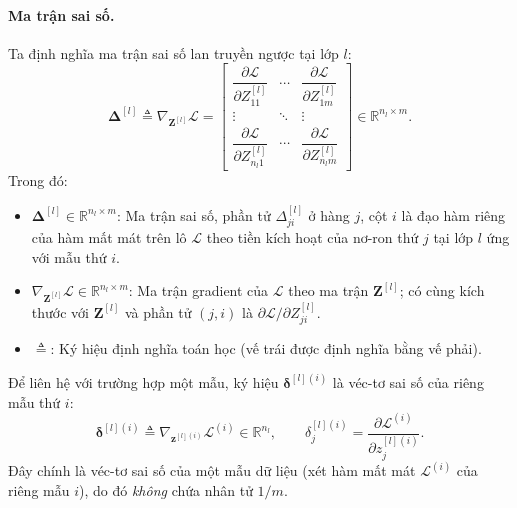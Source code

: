 \paragraph{Ma trận sai số.}
Ta định nghĩa ma trận sai số lan truyền ngược tại lớp $l$:
\begin{equation}
\boldsymbol{\Delta}^{[l]} \triangleq \nabla_{\mathbf{Z}^{[l]}}\mathcal{L} =
\begin{bmatrix}
\dfrac{\partial\mathcal{L}}{\partial Z_{11}^{[l]}} & \cdots & \dfrac{\partial\mathcal{L}}{\partial Z_{1m}^{[l]}} \\[8pt]
\vdots & \ddots & \vdots \\[4pt]
\dfrac{\partial\mathcal{L}}{\partial Z_{n_l 1}^{[l]}} & \cdots & \dfrac{\partial\mathcal{L}}{\partial Z_{n_l m}^{[l]}}
\end{bmatrix}
\in \mathbb{R}^{n_l \times m}.
\label{eq:bpb_delta_def}
\end{equation}
Trong đó:
\begin{itemize}
    \item $\boldsymbol{\Delta}^{[l]} \in \mathbb{R}^{n_l \times m}$: Ma trận sai số, phần tử $\Delta_{ji}^{[l]}$ ở hàng $j$, cột $i$ là đạo hàm riêng của hàm mất mát trên lô $\mathcal{L}$ theo tiền kích hoạt của nơ-ron thứ $j$ tại lớp $l$ ứng với mẫu thứ $i$.
    \item $\nabla_{\mathbf{Z}^{[l]}}\mathcal{L} \in \mathbb{R}^{n_l \times m}$: Ma trận gradient của $\mathcal{L}$ theo ma trận $\mathbf{Z}^{[l]}$; có cùng kích thước với $\mathbf{Z}^{[l]}$ và phần tử $(j,i)$ là $\partial\mathcal{L}/\partial Z_{ji}^{[l]}$.
    \item $\triangleq$: Ký hiệu định nghĩa toán học (vế trái được định nghĩa bằng vế phải).
\end{itemize}
Để liên hệ với trường hợp một mẫu, ký hiệu $\boldsymbol{\delta}^{[l](i)}$ là véc-tơ sai số của riêng mẫu thứ $i$:
\begin{equation}
\boldsymbol{\delta}^{[l](i)} \triangleq \nabla_{\mathbf{z}^{[l](i)}}\mathcal{L}^{(i)} \in \mathbb{R}^{n_l},
\qquad
\delta_j^{[l](i)} = \frac{\partial\mathcal{L}^{(i)}}{\partial z_j^{[l](i)}}.
\label{eq:bpb_delta_single}
\end{equation}
Đây chính là véc-tơ sai số của một mẫu dữ liệu (xét hàm mất mát $\mathcal{L}^{(i)}$ của riêng mẫu $i$), do đó \emph{không} chứa nhân tử $1/m$.
 
